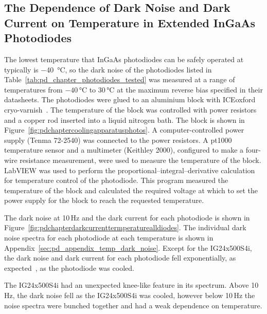 \subsection{The Dependence of Dark Noise and Dark Current on Temperature in Extended InGaAs Photodiodes}
\label{sec:pd_chapter_cooling_experiment}
\par
The lowest temperature that InGaAs photodiodes can be safely operated at typically is \SI{-40}{\degreeCelsius}, so the dark noise of the photodiodes listed in Table~\ref{tab:pd_chapter_photodiodes_tested} was measured at a range of temperatures from $-40\,\si{\degreeCelsius}$ to $30\,\si{\degreeCelsius}$ at the maximum reverse bias specified in their datasheets. The photodiodes were glued to an aluminium block with ICEoxford cryo-varnish~\cite{iceoxford}. The temperature of the block was controlled with power resistors and a copper rod inserted into a liquid nitrogen bath. The block is shown in Figure~\ref{fig:pdchaptercoolingapparatusphotos}. A computer-controlled power supply (Tenma 72-2540) was connected to the power resistors. A pt1000 temperature sensor and a multimeter (Keithley 2000), configured to make a four-wire resistance measurement, were used to measure the temperature of the block. LabVIEW was used to perform the  proportional–integral–derivative calculation for temperature control of the photodiode. This program measured the temperature of the block and calculated the required voltage at which to set the power supply for the block to reach the requested temperature. 
\par
The dark noise at 10\,Hz and the dark current for each photodiode is shown in Figure~\ref{fig:pdchapterdarkcurrenttermperaturealldiodes}. The individual dark noise spectra for each photodiode at each temperature is shown in Appendix~\ref{sec:pd_appendix_temp_dark_noise}. Except for the IG24x500S4i, the dark noise and dark current for each photodiode fell exponentially, as expected~\cite{Forrest1981}, as the photodiode was cooled. 
\par
The IG24x500S4i had an unexpected knee-like feature in its spectrum. Above 10\,Hz, the dark noise fell as the IG24x500S4i was cooled, however below 10\,Hz the noise spectra were bunched together and had a weak dependence on temperature.
